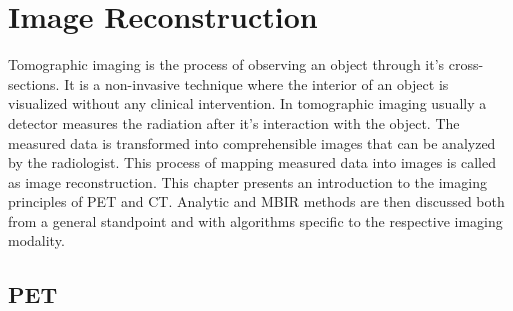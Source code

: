 
\chapter{Image Reconstruction} %

\label{Chapter1} %

Tomographic imaging is the process of observing an object through it's cross-sections. It is a non-invasive technique where the interior of an object is visualized without any clinical intervention. In tomographic imaging usually a detector measures the radiation after it's interaction with the object. The measured data is transformed into comprehensible images that can be analyzed by the radiologist. This process of mapping measured data into images is called as image reconstruction. This chapter presents an introduction to the imaging principles of \ac{PET} and \ac{CT}. Analytic and \ac{MBIR} methods are then discussed both from a general standpoint and with algorithms specific to the respective imaging modality.  
\section{PET}



